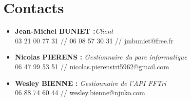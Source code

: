 

	

	
	
	
	\newpage
	
	\tableofcontents
	
	\newpage
	
	\listoffigures
	
	\newpage
	
	
	\newpage
	
	\newpage
	
	\newpage
	
	\newpage
	
	\newpage
	\section* {Contacts}
	\begin{itemize}[label={}]
		\item \textbf{Jean-Michel BUNIET :}\textit{Client } \\03 21 00 77 31 // 06 08 57 30 31 // jmbuniet@free.fr
		\item \textbf{Nicolas PIERENS : }\textit{Gestionnaire du parc informatique }\\  06 47 99 53 51 // nicolas.pierenstri5962@gmail.com
		\item \textbf{Wesley BIENNE : } \textit{Gestionnaire de l'API FFTri}\\
		06 88 74 60 44 // wesley.bienne@njuko.com
	\end{itemize}
	


